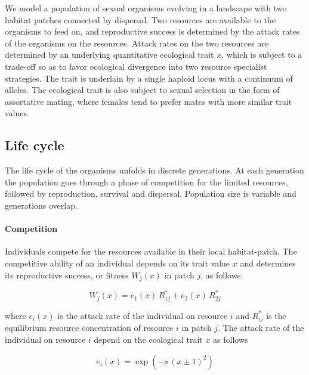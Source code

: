 We model a population of sexual organisms evolving in a landscape with two habitat patches connected by dispersal. Two resources are available to the organisms to feed on, and reproductive success is determined by the attack rates of the organisms on the resources. Attack rates on the two resources are determined by an underlying quantitative ecological trait $x$, which is subject to a trade-off so as to favor ecological divergence into two resource specialist strategies. The trait is underlain by a single haploid locus with a continuum of alleles. The ecological trait is also subject to sexual selection in the form of assortative mating, where females tend to prefer mates with more similar trait values.

\subsection*{Life cycle}

The life cycle of the organisms unfolds in discrete generations. At each generation the population goes through a phase of competition for the limited resources, followed by reproduction, survival and dispersal. Population size is variable and generations overlap.

\paragraph{Competition} Individuals compete for the resources available in their local habitat-patch. The competitive ability of an individual depends on its trait value $x$ and determines its reproductive success, or fitness $W_j(x)$ in patch $j$, as follows:

\begin{equation}
    W_j(x) = e_1(x) \, R^*_{1j} + e_2(x) \, R^*_{2j}
\end{equation}

where $e_i(x)$ is the attack rate of the individual on resource $i$ and $R^*_{ij}$ is the equilibrium resource concentration of resource $i$ in patch $j$. The attack rate of the individual on resource $i$ depend on the ecological trait $x$ as follows

\begin{equation}
    e_i(x) = \exp{(-s \, (x \pm 1)^2)}
    \label{eq:attack_rates}
\end{equation}

